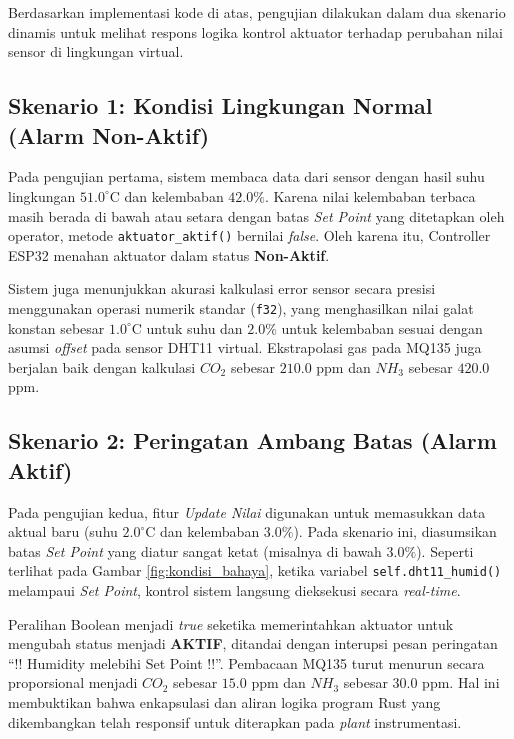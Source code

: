 \documentclass[12pt, a4paper]{article}
\begin{document}
Berdasarkan implementasi kode di atas, pengujian dilakukan dalam dua skenario dinamis untuk melihat respons logika kontrol aktuator terhadap perubahan nilai sensor di lingkungan virtual.

\subsection{Skenario 1: Kondisi Lingkungan Normal (Alarm Non-Aktif)}

Pada pengujian pertama, sistem membaca data dari sensor dengan hasil suhu lingkungan $51.0^\circ \text{C}$ dan kelembaban $42.0\%$. Karena nilai kelembaban terbaca masih berada di bawah atau setara dengan batas \textit{Set Point} yang ditetapkan oleh operator, metode \texttt{aktuator\_aktif()} bernilai \textit{false}. Oleh karena itu, Controller ESP32 menahan aktuator dalam status \textbf{Non-Aktif}. 

Sistem juga menunjukkan akurasi kalkulasi error sensor secara presisi menggunakan operasi numerik standar (\texttt{f32}), yang menghasilkan nilai galat konstan sebesar $1.0^\circ \text{C}$ untuk suhu dan $2.0\%$ untuk kelembaban sesuai dengan asumsi \textit{offset} pada sensor DHT11 virtual. Ekstrapolasi gas pada MQ135 juga berjalan baik dengan kalkulasi $CO_2$ sebesar $210.0$ ppm dan $NH_3$ sebesar $420.0$ ppm.
\newpage
\subsection{Skenario 2: Peringatan Ambang Batas (Alarm Aktif)}

Pada pengujian kedua, fitur \textit{Update Nilai} digunakan untuk memasukkan data aktual baru (suhu $2.0^\circ \text{C}$ dan kelembaban $3.0\%$). Pada skenario ini, diasumsikan batas \textit{Set Point} yang diatur sangat ketat (misalnya di bawah $3.0\%$). Seperti terlihat pada Gambar \ref{fig:kondisi_bahaya}, ketika variabel \texttt{self.dht11\_humid()} melampaui \textit{Set Point}, kontrol sistem langsung dieksekusi secara \textit{real-time}. 

Peralihan Boolean menjadi \textit{true} seketika memerintahkan aktuator untuk mengubah status menjadi \textbf{AKTIF}, ditandai dengan interupsi pesan peringatan ``!! Humidity melebihi Set Point !!''. Pembacaan MQ135 turut menurun secara proporsional menjadi $CO_2$ sebesar $15.0$ ppm dan $NH_3$ sebesar $30.0$ ppm. Hal ini membuktikan bahwa enkapsulasi dan aliran logika program Rust yang dikembangkan telah responsif untuk diterapkan pada \textit{plant} instrumentasi.
\end{document}
